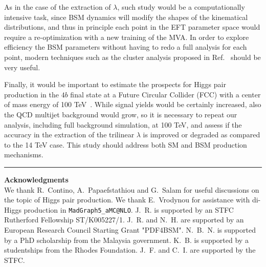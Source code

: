 As in the case of the extraction of $\lambda$, such study
would be a computationally intensive task, since
BSM dynamics will modify the shapes of the kinematical
distributions, and thus in principle each point in the EFT parameter
space would require a re-optimization with a new training
of the MVA.
%
In order to explore efficiency the BSM parameters
without having to redo a full analysis
for each point, modern techniques
such as the cluster analysis proposed
in Ref.~\cite{Dall'Osso:2015aia} should be very useful.

Finally, it would be important to estimate the prospects for
Higgs pair production in the $4b$  final
state at a Future Circular
Collider (FCC) with a center of mass energy of
100 TeV~\cite{Barr:2014sga,Azatov:2015oxa,Papaefstathiou:2015iba}.
%
While signal yields would be certainly increased, also the QCD
multijet background would grow, so it is necessary to repeat
our analysis, including full background simulation, at 100 TeV,
and assess if the accuracy in the extraction of the trilinear $\lambda$
is improved or degraded as compared to the 14 TeV case.
%
This study should address both SM and BSM
production mechanisms.


\bigskip
\bigskip
\begin{center}
\rule{5cm}{.1pt}
\end{center}
\bigskip
\bigskip

{\bf\noindent  Acknowledgments \\}
We thank R.~Contino, A.~Papaefstathiou and
G.~Salam for useful discussions on the topic
of Higgs pair production.
%
We thank E.~Vrodynou for assistance with di-Higgs production
  in {\tt MadGraph5\_aMC@NLO}.
%
J.~R. is supported by an STFC Rutherford Fellowship ST/K005227/1.
%
J.~R. and N.~H. are
supported by an European Research Council Starting Grant "PDF4BSM".
%
N.~B.~N. is supported by a PhD scholarship from the Malaysia
government.
K.~B. is supported by a studentships from the Rhodes Foundation.
%
J.~F. and C.~I. are supported by the STFC.
